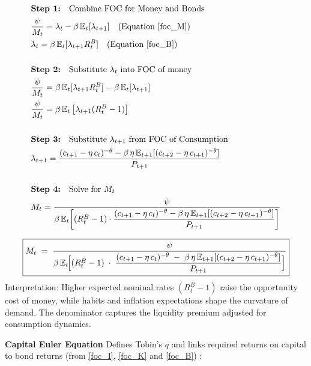\documentclass[11pt,preprint]{elsarticle}
\numberwithin{equation}{section}
\numberwithin{figure}{section}
\numberwithin{table}{section}
\begin{document}
\begin{align*}
& \textbf{Step 1:} \quad \text{Combine FOC for Money and Bonds} \\
& \frac{\psi}{M_t} = \lambda_t - \beta\,\mathbb{E}_t[\lambda_{t+1}] \quad \text{(Equation \ref{foc_M})} \\
& \lambda_t = \beta\,\mathbb{E}_t[\lambda_{t+1}R_t^B] \quad \text{(Equation \ref{foc_B})} \\
& \\
& \textbf{Step 2:} \quad \text{Substitute } \lambda_t \text{ into FOC of money} \\
& \frac{\psi}{M_t} = \beta\,\mathbb{E}_t[\lambda_{t+1}R_t^B] - \beta\,\mathbb{E}_t[\lambda_{t+1}] \\
& \frac{\psi}{M_t} = \beta\,\mathbb{E}_t\left[\lambda_{t+1}(R_t^B - 1)\right] \\
& \\
& \textbf{Step 3:} \quad \text{Substitute } \lambda_{t+1} \text{ from FOC of Consumption} \\
& \lambda_{t+1} = \frac{(c_{t+1} - \eta\,c_t)^{-\theta} - \beta\,\eta\,\mathbb{E}_{t+1}[(c_{t+2} - \eta\,c_{t+1})^{-\theta}]}{P_{t+1}} \\
& \\
& \textbf{Step 4:} \quad \text{Solve for } M_t \\
& M_t = \frac{\psi}{\beta\,\mathbb{E}_t\!\left[ (R_t^B - 1) \cdot \dfrac{(c_{t+1} - \eta\,c_t)^{-\theta} - \beta\,\eta\,\mathbb{E}_{t+1}[(c_{t+2} - \eta\,c_{t+1})^{-\theta}]}{P_{t+1}} \right]}
\end{align*}

\begin{equation}\label{money_demand_app}
\boxed{
  M_t
  \;=\;
  \frac{\psi}
       {\beta\,\mathbb{E}_t\!\Bigl[
         (R_t^B - 1)
         \;\cdot\;
         \dfrac{(c_{t+1} - \eta\,c_t)^{-\theta}
               \;-\;
               \beta\,\eta\,\mathbb{E}_{t+1}[(c_{t+2} - \eta\,c_{t+1})^{-\theta}]}
              {P_{t+1}}
       \Bigr]}
}
\end{equation} Interpretation: Higher expected nominal rates
\((R_t^B - 1)\) raise the opportunity cost of money, while habits and
inflation expectations shape the curvature of demand. The denominator
captures the liquidity premium adjusted for consumption dynamics.

\textbf{Capital Euler Equation } Defines Tobin's \(q\) and links
required returns on capital to bond returns (from \eqref{foc_I},
\eqref{foc_K} and \eqref{foc_B}) :
\end{document}
